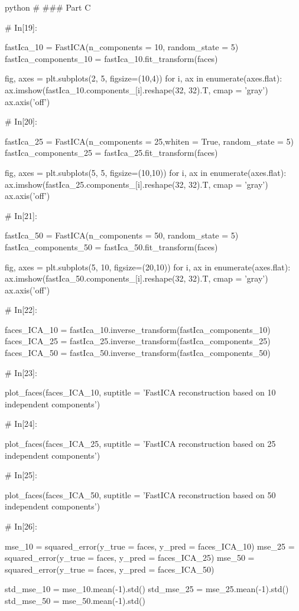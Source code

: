 \documentclass[12pt]{amsart}
\begin{document}
\begin{mintedbox}{python}
# ### Part C

# In[19]:


fastIca_10 = FastICA(n_components = 10, random_state = 5)
fastIca_components_10 = fastIca_10.fit_transform(faces)


fig, axes = plt.subplots(2, 5, figsize=(10,4))
for i, ax in enumerate(axes.flat):
    ax.imshow(fastIca_10.components_[i].reshape(32, 32).T, cmap = 'gray')
    ax.axis('off')


# In[20]:


fastIca_25 = FastICA(n_components = 25,whiten = True, random_state = 5)
fastIca_components_25 = fastIca_25.fit_transform(faces)


fig, axes = plt.subplots(5, 5, figsize=(10,10))
for i, ax in enumerate(axes.flat):
    ax.imshow(fastIca_25.components_[i].reshape(32, 32).T, cmap = 'gray')
    ax.axis('off')


# In[21]:


fastIca_50 = FastICA(n_components = 50, random_state = 5)
fastIca_components_50 = fastIca_50.fit_transform(faces)


fig, axes = plt.subplots(5, 10, figsize=(20,10))
for i, ax in enumerate(axes.flat):
    ax.imshow(fastIca_50.components_[i].reshape(32, 32).T, cmap = 'gray')
    ax.axis('off')


# In[22]:


faces_ICA_10 = fastIca_10.inverse_transform(fastIca_components_10)
faces_ICA_25 = fastIca_25.inverse_transform(fastIca_components_25)
faces_ICA_50 = fastIca_50.inverse_transform(fastIca_components_50)


# In[23]:


plot_faces(faces_ICA_10, suptitle = 'FastICA reconstruction based on 10 independent components')


# In[24]:


plot_faces(faces_ICA_25, suptitle = 'FastICA reconstruction based on 25 independent components')


# In[25]:


plot_faces(faces_ICA_50, suptitle = 'FastICA reconstruction based on 50 independent components')


# In[26]:


mse_10 = squared_error(y_true = faces, y_pred = faces_ICA_10)
mse_25 = squared_error(y_true = faces, y_pred = faces_ICA_25)
mse_50 = squared_error(y_true = faces, y_pred = faces_ICA_50)


std_mse_10 = mse_10.mean(-1).std()
std_mse_25 = mse_25.mean(-1).std()
std_mse_50 = mse_50.mean(-1).std()


\end{mintedbox}
\end{document}
